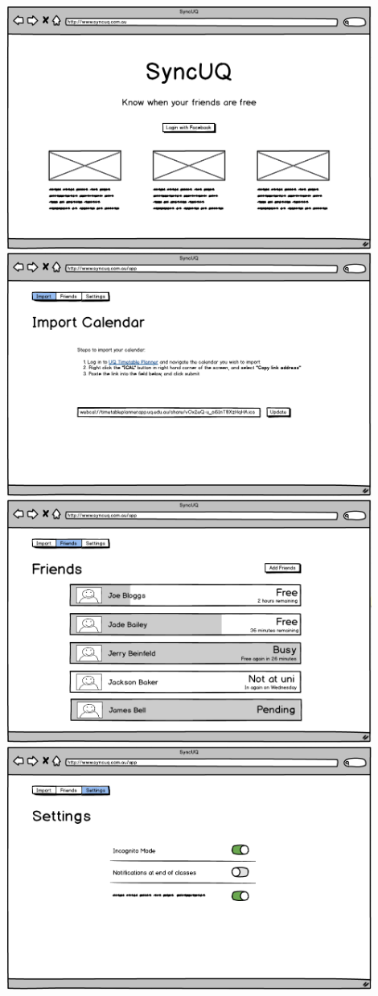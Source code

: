 \documentclass[11pt,a4paper]{report}
\begin{document}
\centering
\includegraphics[width=0.9\textwidth]{Homepage.png}
\medskip
\centering
\medskip
\includegraphics[width=0.9\textwidth]{Import.png}
\medskip
\centering
\includegraphics[width=0.9\textwidth]{Friends.png}
\medskip
\centering
\includegraphics[width=0.9\textwidth]{Settings.png}
\end{document}
